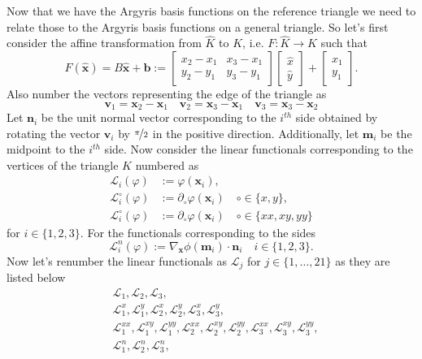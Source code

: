 Now that we have the Argyris basis functions on the reference triangle we need
to relate those to the Argyris basis functions on a general triangle. So let's
first consider the affine transformation from $\hat{K}$ to $K$, i.e. $F: \hat{K}
\to K$ such that
\begin{equation}
  F(\hat{\mathbf{x}}) = B\hat{\mathbf{x}} + \mathbf{b} := 
  \begin{bmatrix}
    x_2 - x_1 & x_3 - x_1 \\ y_2 - y_1 & y_3 - y_1
  \end{bmatrix} \begin{bmatrix}
    \hat{x} \\ \hat{y}
  \end{bmatrix} + \begin{bmatrix}
    x_1 \\ y_1
  \end{bmatrix}.
  \label{eqn:Affine}
\end{equation}
Also number the vectors representing the edge of the triangle as
\begin{equation*}
  \mathbf{v}_1 = \mathbf{x}_2 - \mathbf{x}_1\quad \mathbf{v}_2 = \mathbf{x}_3 -
  \mathbf{x}_1\quad \mathbf{v}_3 = \mathbf{x}_3 - \mathbf{x}_2
\end{equation*}
Let $\mathbf{n}_i$ be the unit normal vector corresponding to the $i^{th}$ side obtained by
rotating the vector $\mathbf{v}_i$ by $\nicefrac{\pi}{2}$ in the positive
direction. Additionally, let $\mathbf{m}_i$ be the midpoint to the $i^{th}$
side.
Now consider the linear functionals corresponding to the vertices of the
triangle $K$ numbered as
\begin{align*}
  \mathcal{L}_i(\varphi) &:= \varphi(\mathbf{x}_i), \\
  \mathcal{L}_i^\circ(\varphi) &:= \partial_\circ \varphi(\mathbf{x}_i) \quad \circ \in
    \{x,y\}, \\
  \mathcal{L}_i^\circ(\varphi) &:= \partial_\circ \varphi(\mathbf{x}_i) \quad \circ \in
    \{xx,xy,yy\}
\end{align*}
for $i\in \{1,2,3\}$. For the functionals corresponding to the sides
\begin{equation*}
  \mathcal{L}_i^n(\varphi) := \nabla_{\mathbf{x}} \phi(\mathbf{m}_i) \cdot
  \mathbf{n}_i \quad i\in\{1,2,3\}.
\end{equation*}
Now let's renumber the linear functionals as $\mathcal{L}_j$ for
$j\in\{1,\dots,21\}$ as they are listed below
\begin{align*}
  &\mathcal{L}_1, \mathcal{L}_2, \mathcal{L}_3, \\
  &\mathcal{L}_1^x, \mathcal{L}_1^y, \mathcal{L}_2^x, \mathcal{L}_2^y,
    \mathcal{L}_3^x, \mathcal{L}_3^y, \\ 
  &\mathcal{L}_1^{xx}, \mathcal{L}_1^{xy}, \mathcal{L}_1^{yy},
    \mathcal{L}_2^{xx}, \mathcal{L}_2^{xy}, \mathcal{L}_2^{yy},
    \mathcal{L}_3^{xx}, \mathcal{L}_3^{xy}, \mathcal{L}_3^{yy}, \\
  &\mathcal{L}_1^n, \mathcal{L}_2^n, \mathcal{L}_3^n,
\end{align*}
